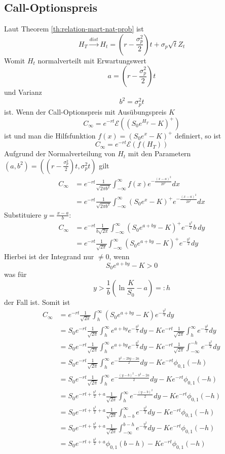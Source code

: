 \documentclass[11pt]{report} %
\begin{document}
\subsection{Call-Optionspreis}
Laut Theorem \ref{th:relation-mart-nat-prob} ist $$H_{T}\xrightarrow{dist}H_t=\left(r-\frac{\sigma_p^2}{2}\right)t+\sigma_p\sqrt{t}Z_t$$
Womit $H_t$ normalverteilt mit Erwartungswert $$a=\left(r-\frac{\sigma_p^2}{2}\right)t$$ und Varianz $$b^2=\sigma_p^2t$$ ist. 
Wenn der Call-Optionspreis mit Ausübungspreis $K$ $$C_\infty=e^{-rt}\mathcal{E}((S_0e^{H_T}-K)^+)$$ist und man die Hilfsfunktion $f(x)=(S_0e^x-K)^+$ definiert, so ist
$$C_\infty=e^{-rt}\mathcal{E}(f(H_T))$$
Aufgrund der Normalverteilung von $H_t$ mit den Parametern $(a, b^2)=\left(\left(r-\frac{\sigma_p^2}{2}\right)t, \sigma_p^2t\right)$ gilt 
\begin{align*}
    C_\infty&=e^{-rt}\frac{1}{\sqrt{2\pi b^2}}\int_{-\infty}^{\infty}f(x)e^{-\frac{(x-a)^2}{2b^2}}dx\\
    &=e^{-rt}\frac{1}{\sqrt{2\pi b^2}}\int_{-\infty}^{\infty}(S_0e^x-K)^+e^{-\frac{(x-a)^2}{2b^2}}dx
\end{align*}
Substituiere $y=\frac{x-a}{b}$:
\begin{align*}
    C_\infty&=e^{-rt}\frac{1}{b\sqrt{2\pi}}\int_{-\infty}^{\infty}(S_0e^{a+by}-K)^+e^{-\frac{y^2}{2}}b\ dy\\
    &=e^{-rt}\frac{1}{\sqrt{2\pi}}\int_{-\infty}^{\infty}(S_0e^{a+by}-K)^+e^{-\frac{y^2}{2}}dy
\end{align*}
Hierbei ist der Integrand nur $\neq0$, wenn $$S_0e^{a+by}-K>0$$ was für $$y>\frac{1}{b}\left(\ln{\frac{K}{S_0}}-a\right)=:h$$ der Fall ist. Somit ist 
\begin{align*}
    C_\infty&=e^{-rt}\frac{1}{\sqrt{2\pi}}\int_{h}^{\infty}(S_0e^{a+by}-K)e^{-\frac{y^2}{2}}dy\\
    &=S_0e^{-rt}\frac{1}{\sqrt{2\pi}}\int_{h}^{\infty}e^{a+by}e^{-\frac{y^2}{2}}dy-Ke^{-rt}\frac{1}{\sqrt{2\pi}}\int_{h}^{\infty}e^{-\frac{y^2}{2}}dy\\
    &=S_0e^{-rt}\frac{1}{\sqrt{2\pi}}\int_{h}^{\infty}e^{a+by}e^{-\frac{y^2}{2}}dy-Ke^{-rt}\frac{1}{\sqrt{2\pi}}\int_{-\infty}^{-h}e^{-\frac{y^2}{2}}dy\\
    &=S_0e^{-rt}\frac{1}{\sqrt{2\pi}}\int_{h}^{\infty}e^{-\frac{y^2-2by-2a}{2}}dy-Ke^{-rt}\phi_{0, 1}(-h)\\
    &=S_0e^{-rt}\frac{1}{\sqrt{2\pi}}\int_{h}^{\infty}e^{-\frac{(y-b)^2-b^2-2a}{2}}dy-Ke^{-rt}\phi_{0, 1}(-h)\\
    &=S_0e^{-rt+\frac{b^2}{2}+a}\frac{1}{\sqrt{2\pi}}\int_{h}^{\infty}e^{-\frac{(y-b)^2}{2}}dy-Ke^{-rt}\phi_{0, 1}(-h)\\
    &=S_0e^{-rt+\frac{b^2}{2}+a}\frac{1}{\sqrt{2\pi}}\int_{h-b}^{\infty}e^{-\frac{y^2}{2}}dy-Ke^{-rt}\phi_{0, 1}(-h)\\
    &=S_0e^{-rt+\frac{b^2}{2}+a}\frac{1}{\sqrt{2\pi}}\int_{-\infty}^{b-h}e^{-\frac{y^2}{2}}dy-Ke^{-rt}\phi_{0, 1}(-h)\\
    &=S_0e^{-rt+\frac{b^2}{2}+a}\phi_{0, 1}(b-h)-Ke^{-rt}\phi_{0, 1}(-h)
\end{align*}
\end{document}

